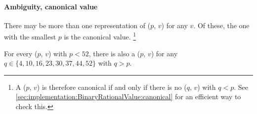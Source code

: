 \paragraph{Ambiguity, canonical value}

There may be more than one representation of ($p$, $v$) for any $v$.
Of these, the one with the smallest $p$ is the canonical value.%
\footnote{
    A ($p$, $v$) is therefore canonical if and only if there is
    no ($q$, $v$) with $q < p$.
    See \ref{sec:implementation:BinaryRationalValue:canonical} for an efficient way to check this.
}

For every ($p$, $v$) with $p < 52$, there is also
a ($p$, $v$) for any
$q \in \{4, 10, 16, 23, 30, 37, 44, 52\}$ with $q > p$.
